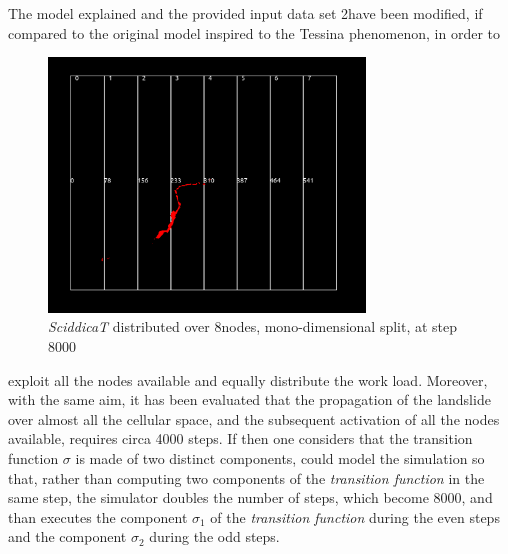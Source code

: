 \documentclass[12pt,a4paper,fleqn]{report}
\begin{document}
The model explained and the provided input data set 2have been modified, if 
compared to the original model inspired to the Tessina phenomenon, in order to 

 \begin{figure}[ht!]
\centering
	\vspace{13pt}
    \includegraphics[trim=0mm 10mm 0mm 10mm,width=0.75\textwidth]{late_state}
    \caption{\textit{SciddicaT} distributed over 8nodes, mono-dimensional split, at step 8000}
\end{figure}

\newpage
exploit all the nodes available and equally distribute the work load. Moreover, with the same aim, it has been evaluated that the propagation of the landslide over almost all the cellular space, and the subsequent activation of all the nodes available, requires circa 4000 steps. If then one considers that the transition function $\sigma$ is made of two distinct components, could model the simulation so that, rather than computing two components of the \textit{transition function} in the same step, the simulator doubles the number of steps, which become 8000, and than executes the component $\sigma_1$ of the \textit{transition function} during the even steps and the component $\sigma_2$ during the odd steps.
\end{document}
